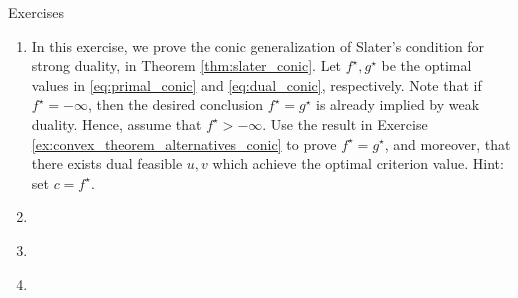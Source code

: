\begin{xcb}{Exercises}
\begin{enumerate}[label=\thechapter.\arabic*]
\item \label{ex:slater_conic}
  In this exercise, we prove the conic generalization of Slater's condition for
  strong duality, in Theorem \ref{thm:slater_conic}. Let $f^\star, g^\star$ be
  the optimal values in \eqref{eq:primal_conic} and \eqref{eq:dual_conic},
  respectively. Note that if $f^\star = -\infty$, then the desired conclusion
  $f^\star = g^\star$ is already implied by weak duality. Hence, assume that
  $f^\star > -\infty$. Use the result in Exercise
  \ref{ex:convex_theorem_alternatives_conic} to prove $f^\star = g^\star$, and
  moreover, that there exists dual feasible $u,v$ which achieve the optimal
  criterion value. Hint: set $c = f^\star$.   



\item \label{ex:dual_conic}

\item \label{ex:slater_conic_program}

\item \label{ex:trace_norm_semidefinite} 




\end{enumerate}
\end{xcb}
